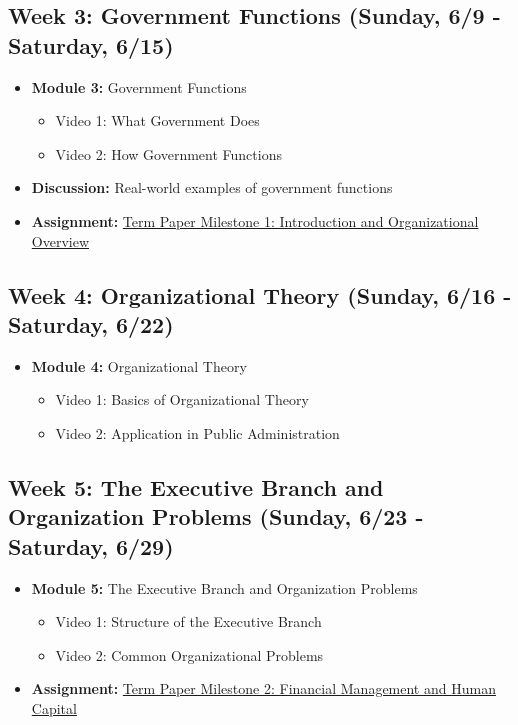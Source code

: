\documentclass[11pt, letterpaper]{article}
\begin{document}
\subsection*{Week 3: Government Functions (Sunday, 6/9 - Saturday, 6/15)}
\begin{itemize}
    \item \textbf{Module 3:} Government Functions
    \begin{itemize}
        \item Video 1: What Government Does
        \item Video 2: How Government Functions
    \end{itemize}
    \item \textbf{Discussion:} Real-world examples of government functions
    \item \textbf{Assignment:} \href{https://us.kritik.io/course/cltwics8d035m146piz0jn5t0/assignment/clwmrwdll013ufih40nlg0gar?resultsPerPage=50&page=1&filterBy=SHOW_ALL&searchString=&sortBy=NAME&sortOrder=1&viewType=Progress}{Term Paper Milestone 1: Introduction and Organizational Overview}
\end{itemize}

\subsection*{Week 4: Organizational Theory (Sunday, 6/16 - Saturday, 6/22)}
\begin{itemize}
    \item \textbf{Module 4:} Organizational Theory
    \begin{itemize}
        \item Video 1: Basics of Organizational Theory
        \item Video 2: Application in Public Administration
    \end{itemize}
\end{itemize}

\subsection*{Week 5: The Executive Branch and Organization Problems (Sunday, 6/23 - Saturday, 6/29)}
\begin{itemize}
    \item \textbf{Module 5:} The Executive Branch and Organization Problems
    \begin{itemize}
        \item Video 1: Structure of the Executive Branch
        \item Video 2: Common Organizational Problems
    \end{itemize}
    \item \textbf{Assignment:} \href{hhttps://us.kritik.io/course/cltwics8d035m146piz0jn5t0/assignment/clwms1l5k0125f8blzdaawh9x?resultsPerPage=50&page=1&filterBy=SHOW_ALL&searchString=&sortBy=NAME&sortOrder=1&viewType=Progress}{Term Paper Milestone 2: Financial Management and Human Capital}
\end{itemize}
\end{document}
